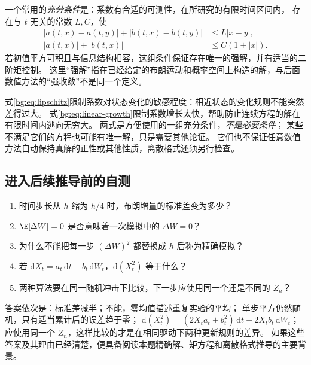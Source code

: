 一个常用的\emph{充分条件}是：系数有合适的可测性，在所研究的有限时间区间内，
存在与 $t$ 无关的常数 $L,C$，使
\begin{align}
 |a(t,x)-a(t,y)|+|b(t,x)-b(t,y)|&\leq L|x-y|,
 \label{bg:eq:lipschitz}\\
 |a(t,x)|+|b(t,x)|&\leq C(1+|x|).
 \label{bg:eq:linear-growth}
\end{align}
若初值平方可积且与信息结构相容，这组条件保证存在唯一的强解，并有适当的二阶矩控制。
这里“强解”指在已经给定的布朗运动和概率空间上构造的解，与后面数值方法的“强收敛”不是同一个定义。

式\eqref{bg:eq:lipschitz}限制系数对状态变化的敏感程度：相近状态的变化规则不能突然差得过大。
式\eqref{bg:eq:linear-growth}限制系数增长太快，帮助防止连续方程的解在有限时间内逃向无穷大。
两式是方便使用的一组充分条件，\emph{不是必要条件}；
某些不满足它们的方程也可能有唯一解，只是需要其他论证。
它们也不保证任意数值方法自动保持真解的正性或其他性质，离散格式还须另行检查。

\subsection{进入后续推导前的自测}
\label{bg:sub:self-check}

\begin{enumerate}
  \item 时间步长从 $h$ 缩为 $h/4$ 时，布朗增量的标准差变为多少？
  \item $\E[\Delta W]=0$ 是否意味着一次模拟中的 $\Delta W=0$？
  \item 为什么不能把每一步 $(\Delta W)^2$ 都替换成 $h$ 后称为精确模拟？
  \item 若 $\mathrm dX_t=a_t\,\mathrm dt+b_t\,\mathrm dW_t$，$\mathrm d(X_t^2)$ 等于什么？
  \item 两种算法要在同一随机冲击下比较，下一步应使用同一个还是不同的 $Z_n$？
\end{enumerate}

答案依次是：标准差减半；不能，零均值描述重复实验的平均；
单步平方仍然随机，只有适当累计后的误差趋于零；
$\mathrm d(X_t^2)=(2X_ta_t+b_t^2)\,\mathrm dt+2X_tb_t\,\mathrm dW_t$；
应使用同一个 $Z_n$，这样比较的才是在相同驱动下两种更新规则的差异。
如果这些答案及其理由已经清楚，便具备阅读本题精确解、矩方程和离散格式推导的主要背景。
